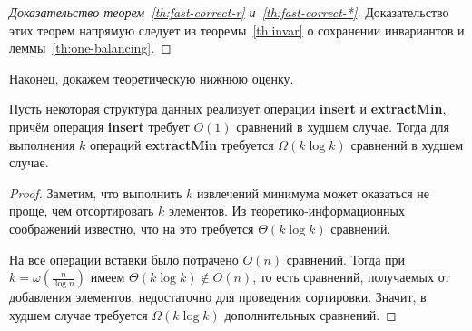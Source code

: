 \begin{proof}[Доказательство теорем~\ref{th:fast-correct-r} и~\ref{th:fast-correct-*}]
Доказательство этих теорем напрямую следует из теоремы~\ref{th:invar}
о сохранении инвариантов и леммы~\ref{th:one-balancing}.
\end{proof}

Наконец, докажем теоретическую нижнюю оценку.

\begin{theorem} \label{th:lower_bound}
Пусть некоторая структура данных реализует операции \textbf{insert} и
\textbf{extractMin}, причём операция \textbf{insert} требует $O(1)$ сравнений
в худшем случае. Тогда для выполнения $k$ операций \textbf{extractMin}
требуется $\Omega(k \log k)$ сравнений в худшем случае.
\end{theorem}
\begin{proof}
Заметим, что выполнить $k$ извлечений минимума может оказаться не проще,
чем отсортировать $k$ элементов. Из теоретико-информационных соображений
известно, что на это требуется $\Theta(k \log k)$ сравнений\cite[с.~222]{Cormen}.

На все операции вставки было потрачено $O(n)$ сравнений.
Тогда при $k = \omega(\frac{n}{\log n})$ имеем $\Theta(k \log k) \notin O(n)$,
то есть сравнений, получаемых от добавления элементов, недостаточно
для проведения сортировки. Значит, в худшем случае
требуется $\Omega(k \log k)$ дополнительных сравнений.
\end{proof}
